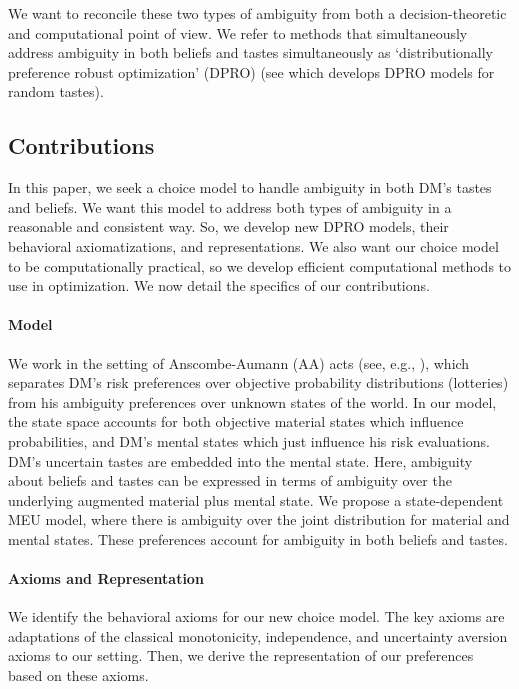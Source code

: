 \documentclass[11pt,oneside]{article}
\theoremstyle{plain}
\theoremstyle{plain}
\theoremstyle{plain}
\theoremstyle{plain}
\theoremstyle{plain}
\theoremstyle{definition}
\theoremstyle{definition}
\theoremstyle{remark}
\theoremstyle{plain}
\begin{document}
We want to reconcile these two types of ambiguity from both a decision-theoretic and computational point of view.
We refer to methods that simultaneously address ambiguity in both beliefs and tastes simultaneously as `distributionally preference robust optimization' (DPRO) (see \cite{hu2024distributional} which develops DPRO models for random tastes).



\subsection{Contributions}

In this paper, we seek a choice model to handle ambiguity in both DM's tastes and beliefs.
We want this model to address both types of ambiguity in a reasonable and consistent way.
So, we develop new DPRO models, their behavioral axiomatizations, and representations.
We also want our choice model to be computationally practical, so we develop efficient computational methods to use in optimization.
We now detail the specifics of our contributions.

\paragraph*{Model}
We work in the setting of Anscombe-Aumann (AA) acts (see, e.g., \cite{gilboa2016ambiguity}), which separates DM's risk preferences over objective probability distributions (lotteries) from his ambiguity preferences over unknown states of the world.
In our model, the state space accounts for both objective material states which influence probabilities, and DM's mental states which just influence his risk evaluations.
DM's uncertain tastes are embedded into the mental state.
Here, ambiguity about beliefs and tastes can be expressed in terms of ambiguity over the underlying augmented material plus mental state.
We propose a state-dependent MEU model, where there is ambiguity over the joint distribution for material and mental states.
These preferences account for ambiguity in both beliefs and tastes.

\paragraph*{Axioms and Representation}
We identify the behavioral axioms for our new choice model. The key axioms are adaptations of the classical monotonicity, independence, and uncertainty aversion axioms to our setting.
Then, we derive the representation of our preferences based on these axioms.
\end{document}
